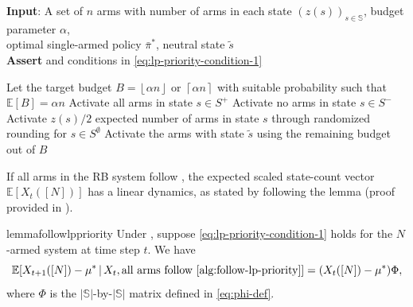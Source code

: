 \documentclass[11pt,letterpaper]{article}
\theoremstyle{plain}
\theoremstyle{definition}
\theoremstyle{remark}
\newcommand{\E}[1]{\mathbb{E}\left[#1\right]}
\newcommand{\Eplain}[1]{\mathbb{E}[#1]}
\newcommand{\givenplain}{\,|\,}
\newcommand{\ceil}[1]{\left\lceil#1\right\rceil}
\newcommand{\floor}[1]{\left\lfloor#1\right\rfloor}
\newcommand{\sspa}{\mathbb{S}}
\newcommand{\bsub}{B}
\newcommand{\pibar}{{\sysbar{\pi}}}
\newcommand{\pibs}{{\pibar^*}}
\newcommand{\sysbar}[1]{\bar{#1}}
\newcommand{\statdist}{\mu^*}
\newcommand{\sneu}{\tilde{s}}
\begin{document}
\begin{subroutine}[t]
\caption{Optimal Local Control (Local LP-Priority)}
\label{alg:follow-lp-priority}
\hspace*{\algorithmicindent} \textbf{Input}: A set of $n$ arms with number of arms in each state $(z(s))_{s\in\sspa}$, budget parameter $\alpha$, \\
\hspace*{\algorithmicindent} \hspace{0.37in} optimal single-armed policy $\pibs$, neutral state $\sneu$ \\
\hspace*{\algorithmicindent} \textbf{Assert}  and conditions in \eqref{eq:lp-priority-condition-1}
\begin{algorithmic}[1]
    \State Let the target budget $\bsub=\floor{\alpha n}$ or $\ceil{\alpha n}$ with suitable probability such that $\E{B} = \alpha n$
    \State Activate all arms in state $s\in S^+$\label{alg:lp-priority:non-sneu-actions-0}
    \State Activate no arms in state $s\in S^-$\label{alg:lp-priority:non-sneu-actions-1}
    \State Activate $z(s)/2$ expected number of arms in state $s$ through randomized rounding for $s\in S^{\emptyset}$\label{alg:lp-priority:non-sneu-actions-2}
    \State Activate the arms with state $\sneu$ using the remaining budget out of $\bsub$ \label{alg:lp-priority:sneu-actions}
\end{algorithmic}
\end{subroutine}



If all arms in the RB system follow , the expected scaled state-count vector $\Eplain{X_t([N])}$ has a linear dynamics, as stated by following the lemma (proof provided in ). 

\begin{restatable}{lemma}{followlppriority}\label{lem:lp-priority-and-phi}
    Under , suppose \eqref{eq:lp-priority-condition-1} holds for the $N$-armed system at time step $t$. We have
    \begin{equation}\label{eq:lp-priority-trans}
        \Eplain{X_{t+1}([N]) -\statdist \givenplain X_t, \text{all arms follow \Cref{alg:follow-lp-priority}}} = (X_t([N]) - \statdist) \Phi,
    \end{equation} 
    where $\Phi$ is the $|\sspa|$-by-$|\sspa|$ matrix defined in \eqref{eq:phi-def}. 
\end{restatable}
\end{document}
